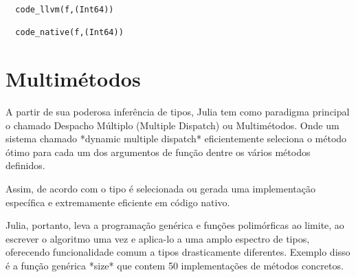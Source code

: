 \begin{lstlisting}
  code_llvm(f,(Int64))

  code_native(f,(Int64))
\end{lstlisting}

\section{Multimétodos}
A partir de sua poderosa inferência de tipos, Julia tem como paradigma principal o chamado Despacho Múltiplo (Multiple Dispatch) ou Multimétodos. Onde um sistema chamado *dynamic multiple dispatch* eficientemente seleciona o método ótimo para cada um dos argumentos de função dentre os vários métodos definidos. %

Assim, de acordo com o tipo é selecionada ou gerada uma implementação específica e extremamente eficiente em código nativo. %

Julia, portanto, leva a programação genérica e funções polimórficas ao limite, ao escrever o algoritmo uma vez e aplica-lo a uma amplo espectro de tipos, oferecendo funcionalidade comum a tipos drasticamente diferentes. Exemplo disso é a função genérica *size* que contem 50 implementações de métodos concretos. %

